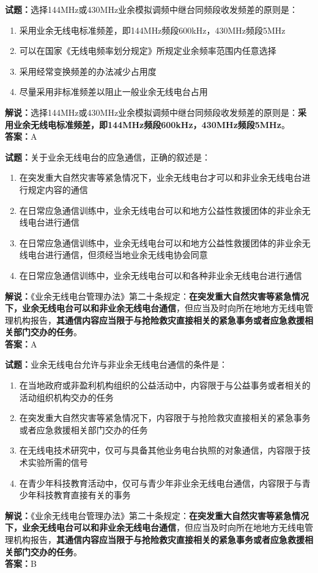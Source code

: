 \documentclass{ctexbook}
\begin{document}
\bigskip


\noindent\textbf{试题：}选择144MHz或430MHz业余模拟调频中继台同频段收发频差的原则是：
\begin{enumerate}[leftmargin=3em]
\item 采用业余无线电标准频差，即144MHz频段600kHz，430MHz频段5MHz
\item 可以在国家《无线电频率划分规定》所规定业余频率范围内任意选择
\item 采用经常变换频差的办法减少占用度
\item 尽量采用非标准频差以阻止一般业余无线电台占用
\end{enumerate}
\noindent\textbf{解说：}选择144MHz或430MHz业余模拟调频中继台同频段收发频差的原则是：\textbf{采用业余无线电标准频差，即144MHz频段600kHz，430MHz频段5MHz}。\\\noindent\textbf{答案：}A


\bigskip


\noindent\textbf{试题：}关于业余无线电台的应急通信，正确的叙述是：
\begin{enumerate}[leftmargin=3em]
\item 在突发重大自然灾害等紧急情况下，业余无线电台才可以和非业余无线电台进行规定内容的通信
\item 在日常应急通信训练中，业余无线电台可以和地方公益性救援团体的非业余无线电台进行通信
\item 在日常应急通信训练中，业余无线电台可以和地方公益性救援团体的非业余无线电台进行通信，但须经当地业余无线电协会同意
\item 在日常应急通信训练中，业余无线电台可以和各种非业余无线电台进行通信
\end{enumerate}
\noindent\textbf{解说：}《业余无线电台管理办法》第二十条规定：\textbf{在突发重大自然灾害等紧急情况下，业余无线电台可以和非业余无线电台通信}，但应当及时向所在地地方无线电管理机构报告，\textbf{其通信内容应当限于与抢险救灾直接相关的紧急事务或者应急救援相关部门交办的任务}。\\\noindent\textbf{答案：}A



\bigskip


\noindent\textbf{试题：}业余无线电台允许与非业余无线电台通信的条件是：
\begin{enumerate}[leftmargin=3em]
\item 在当地政府或非盈利机构组织的公益活动中，内容限于与公益事务或者相关的活动组织机构交办的任务
\item 在突发重大自然灾害等紧急情况下，内容限于与抢险救灾直接相关的紧急事务或者应急救援相关部门交办的任务
\item 在无线电技术研究中，仅可与具备其他业务电台执照的对象通信，内容限于技术实验所需的信号
\item 在青少年科技教育活动中，仅可与青少年非业余无线电台通信，内容限于与青少年科技教育直接有关的事务
\end{enumerate}
\noindent\textbf{解说：}《业余无线电台管理办法》第二十条规定：\textbf{在突发重大自然灾害等紧急情况下，业余无线电台可以和非业余无线电台通信}，但应当及时向所在地地方无线电管理机构报告，\textbf{其通信内容应当限于与抢险救灾直接相关的紧急事务或者应急救援相关部门交办的任务}。\\\noindent\textbf{答案：}B
\end{document}
